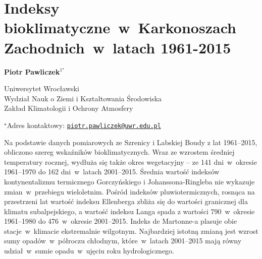 \documentclass[\main/boa.tex]{subfiles}
\begin{document}
\section{Indeksy bioklimatyczne~w~Karkonoszach Zachodnich~w~latach 1961-2015}

\begin{center}
  {\bf {} Piotr Pawliczek$^{1^\star}$}
\end{center}

\vskip 0.3cm

\begin{affiliations}
\begin{enumerate}
\begin{minipage}{0.915\textwidth}
\centering
\item Uniwersytet Wrocławski\\ Wydział Nauk o Ziemi i Kształtowania Środowiska\\ Zakład Klimatologii i Ochrony Atmosfery\\[-2pt]
\end{minipage}
\end{enumerate}
$^\star$Adres kontaktowy: \href{mailto:piotr.pawliczek@uwr.edu.pl}{\nolinkurl{piotr.pawliczek@uwr.edu.pl}}\\
\end{affiliations}

\vskip 0.5cm


\vskip 0.5cm

Na podstawie danych pomiarowych ze Szrenicy i Labskiej Boudy z lat 1961--2015, obliczono szereg wskaźników bioklimatycznych. Wraz ze wzrostem średniej temperatury rocznej, wydłuża się także okres wegetacyjny -- ze 141 dni~w~okresie 1961--1970 do 162 dni~w~latach 2001--2015. Średnia wartość indeksów kontynentalizmu termicznego Gorczyńskiego i Johanssona-Ringleba nie wykazuje zmian~w~przebiegu wieloletnim. Pośród indeksów pluwiotermicznych, rosnąca na przestrzeni lat wartość indeksu Ellenberga zbliża się do wartości granicznej dla klimatu subalpejskiego, a wartość indeksu Langa spada z wartości 790~w~okresie 1961--1980 do 476~w~okresie 2001--2015. Indeks  de Martonne-a plasuje obie stacje~w~klimacie ekstremalnie wilgotnym. Najbardziej istotną zmianą jest wzrost sumy opadów~w~półroczu chłodnym, które~w~latach 2001--2015 mają równy udział~w~sumie opadu~w~ujęciu roku hydrologicznego.
\end{document}
